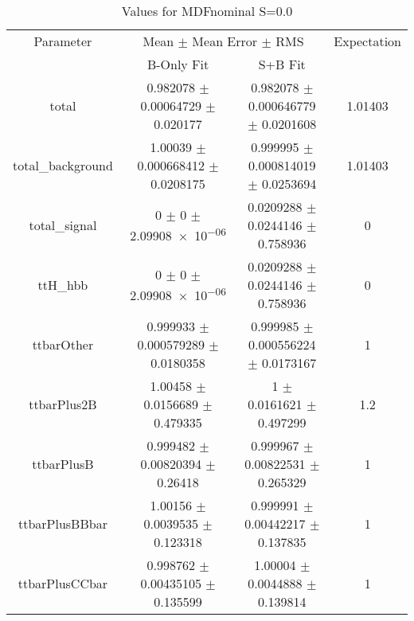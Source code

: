 \begin{table}
\centering
\caption{Values for MDFnominal S=0.0}
\begin{tabular}{cccc}
\toprule
Parameter & \multicolumn{2}{c}{Mean $\pm$ Mean Error $\pm$ RMS} & Expectation\\
 & B-Only Fit & S+B Fit & \\
\midrule
total & \num{0.982078} $\pm$ \num{0.00064729} $\pm$ \num{0.020177} & \num{0.982078} $\pm$ \num{0.000646779} $\pm$ \num{0.0201608} & \num{1.01403}\\
total\_background & \num{1.00039} $\pm$ \num{0.000668412} $\pm$ \num{0.0208175} & \num{0.999995} $\pm$ \num{0.000814019} $\pm$ \num{0.0253694} & \num{1.01403}\\
total\_signal & \num{0} $\pm$ \num{0} $\pm$ \num{2.09908e-06} & \num{0.0209288} $\pm$ \num{0.0244146} $\pm$ \num{0.758936} & \num{0}\\
ttH\_hbb & \num{0} $\pm$ \num{0} $\pm$ \num{2.09908e-06} & \num{0.0209288} $\pm$ \num{0.0244146} $\pm$ \num{0.758936} & \num{0}\\
ttbarOther & \num{0.999933} $\pm$ \num{0.000579289} $\pm$ \num{0.0180358} & \num{0.999985} $\pm$ \num{0.000556224} $\pm$ \num{0.0173167} & \num{1}\\
ttbarPlus2B & \num{1.00458} $\pm$ \num{0.0156689} $\pm$ \num{0.479335} & \num{1} $\pm$ \num{0.0161621} $\pm$ \num{0.497299} & \num{1.2}\\
ttbarPlusB & \num{0.999482} $\pm$ \num{0.00820394} $\pm$ \num{0.26418} & \num{0.999967} $\pm$ \num{0.00822531} $\pm$ \num{0.265329} & \num{1}\\
ttbarPlusBBbar & \num{1.00156} $\pm$ \num{0.0039535} $\pm$ \num{0.123318} & \num{0.999991} $\pm$ \num{0.00442217} $\pm$ \num{0.137835} & \num{1}\\
ttbarPlusCCbar & \num{0.998762} $\pm$ \num{0.00435105} $\pm$ \num{0.135599} & \num{1.00004} $\pm$ \num{0.0044888} $\pm$ \num{0.139814} & \num{1}\\
\bottomrule
\end{tabular}
\end{table}